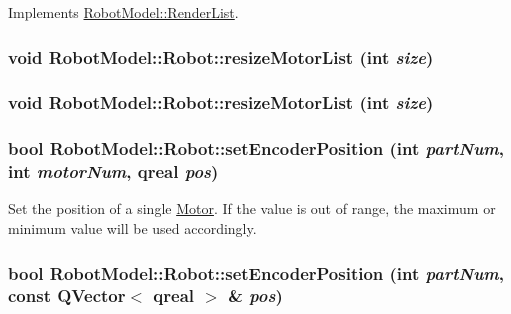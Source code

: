 Implements \hyperlink{class_robot_model_1_1_render_list_ac8646765beee22bf11582049dc3cf195}{RobotModel::RenderList}.\hypertarget{class_robot_model_1_1_robot_a2521948f148183c97428155be0eea923}{
\subsubsection[{resizeMotorList}]{\setlength{\rightskip}{0pt plus 5cm}void RobotModel::Robot::resizeMotorList (int {\em size})}}
\label{class_robot_model_1_1_robot_a2521948f148183c97428155be0eea923}
\hypertarget{class_robot_model_1_1_robot_a2521948f148183c97428155be0eea923}{
\subsubsection[{resizeMotorList}]{\setlength{\rightskip}{0pt plus 5cm}void RobotModel::Robot::resizeMotorList (int {\em size})}}
\label{class_robot_model_1_1_robot_a2521948f148183c97428155be0eea923}
\hypertarget{class_robot_model_1_1_robot_a8e66688b7abcf8cadd86c463c6c97458}{
\subsubsection[{setEncoderPosition}]{\setlength{\rightskip}{0pt plus 5cm}bool RobotModel::Robot::setEncoderPosition (int {\em partNum}, \/  int {\em motorNum}, \/  qreal {\em pos})}}
\label{class_robot_model_1_1_robot_a8e66688b7abcf8cadd86c463c6c97458}


Set the position of a single \hyperlink{class_robot_model_1_1_motor}{Motor}. If the value is out of range, the maximum or minimum value will be used accordingly. \hypertarget{class_robot_model_1_1_robot_a0d1c835b7a107a1ff6fe36bc9cf0622e}{
\subsubsection[{setEncoderPosition}]{\setlength{\rightskip}{0pt plus 5cm}bool RobotModel::Robot::setEncoderPosition (int {\em partNum}, \/  const QVector$<$ qreal $>$ \& {\em pos})}}
\label{class_robot_model_1_1_robot_a0d1c835b7a107a1ff6fe36bc9cf0622e}


